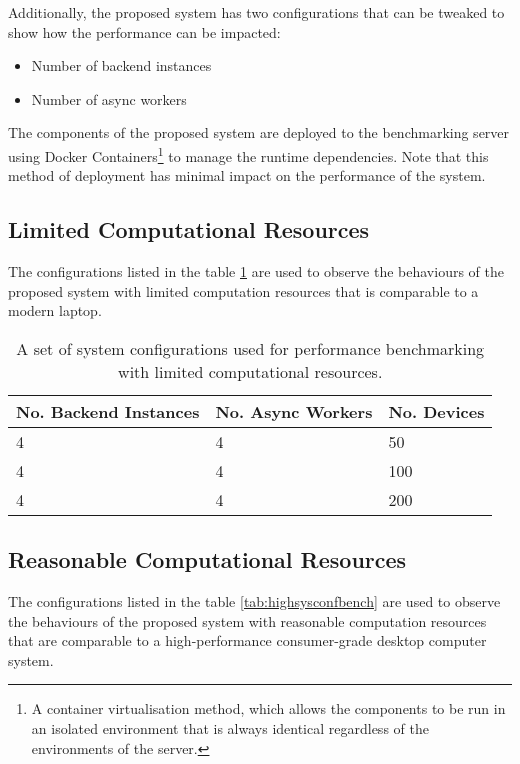 \documentclass[../thesis.tex]{subfiles}
\begin{document}
Additionally, the proposed system has two configurations that can be tweaked to show how the performance can be impacted:

\begin{itemize}
\item Number of backend instances
\item Number of async workers
\end{itemize}

The components of the proposed system are deployed to the benchmarking server using Docker Containers\footnote{A container virtualisation method, which allows the components to be run in an isolated environment that is always identical regardless of the environments of the server.} to manage the runtime dependencies. Note that this method of deployment has minimal impact on the performance of the system.

\subsection{Limited Computational Resources}
The configurations listed in the table \ref{tab:lowsysconfbench} are used to observe the behaviours of the proposed system with limited computation resources that is comparable to a modern laptop.

\begin{table}[h!]
\begin{center}
\caption{A set of system configurations used for performance benchmarking with limited computational resources.}
\label{tab:lowsysconfbench}
\begin{tabular}{l|l|l}
\toprule
\textbf{No. Backend Instances} & \textbf{No. Async Workers} & \textbf{No. Devices}\\
\midrule
4 & 4 & 50\\
4 & 4 & 100\\
4 & 4 & 200\\
\bottomrule
\end{tabular}
\end{center}
\end{table}

\subsection{Reasonable Computational Resources}

The configurations listed in the table \ref{tab:highsysconfbench} are used to observe the behaviours of the proposed system with reasonable computation resources that are comparable to a high-performance consumer-grade desktop computer system.
\end{document}
